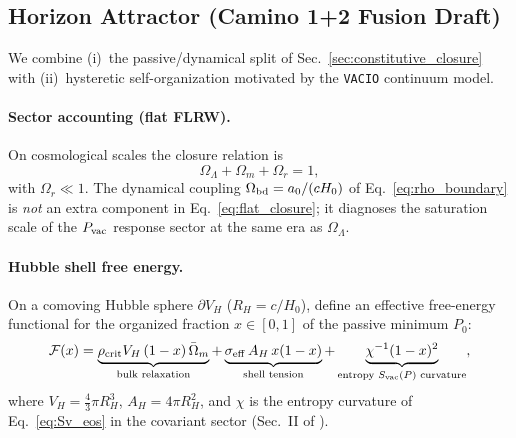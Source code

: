 
\subsection{Horizon Attractor (Camino 1+2 Fusion Draft)}
\label{sec:horizon_attractor}

We combine (i)~the passive/dynamical split of
Sec.~\ref{sec:constitutive_closure} with (ii)~hysteretic self-organization
motivated by the \texttt{VACIO} continuum model.

\paragraph{Sector accounting (flat FLRW).}
On cosmological scales the closure relation is
\begin{equation}
\label{eq:flat_closure}
\Omega_\Lambda + \Omega_m + \Omega_r = 1,
\end{equation}
with $\Omega_r\ll 1$.
The dynamical coupling $\Omega_{\rm bd}=a_0/(cH_0)$ of
Eq.~\eqref{eq:rho_boundary} is \emph{not} an extra component in
Eq.~\eqref{eq:flat_closure}; it diagnoses the saturation scale of the
$P_{\rm vac}$ response sector at the same era as $\Omega_\Lambda$.

\paragraph{Hubble shell free energy.}
On a comoving Hubble sphere $\partial V_H$ ($R_H=c/H_0$), define an
effective free-energy functional for the organized fraction
$x\in[0,1]$ of the passive minimum $P_0$:
\begin{equation}
\label{eq:F_horizon}
\mathcal{F}(x)
=
\underbrace{\rho_{\rm crit}V_H\,(1-x)\,\bar\Omega_m}_{\text{bulk relaxation}}
+
\underbrace{\sigma_{\rm eff}\,A_H\,x(1-x)}_{\text{shell tension}}
+
\underbrace{\chi^{-1}(1-x)^2}_{\text{entropy $S_{\rm vac}(P)$ curvature}},
\end{equation}
where $V_H=\frac{4}{3}\pi R_H^3$, $A_H=4\pi R_H^2$, and $\chi$ is the
entropy curvature of Eq.~\eqref{eq:Sv_eos} in the covariant sector
(Sec.~II of \cite{gravedad3zenodo}).

